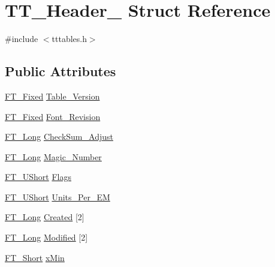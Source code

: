 \hypertarget{struct_t_t___header__}{}\section{T\+T\+\_\+\+Header\+\_\+ Struct Reference}
\label{struct_t_t___header__}


{\ttfamily \#include $<$tttables.\+h$>$}

\subsection*{Public Attributes}
\begin{DoxyCompactItemize}
\item 
\mbox{\hyperlink{fttypes_8h_a5f5a679cc09f758efdd0d1c5feed3c3d}{F\+T\+\_\+\+Fixed}} \mbox{\hyperlink{struct_t_t___header___ab14622e8f8f80ee8361f4847cf9c36e1}{Table\+\_\+\+Version}}
\item 
\mbox{\hyperlink{fttypes_8h_a5f5a679cc09f758efdd0d1c5feed3c3d}{F\+T\+\_\+\+Fixed}} \mbox{\hyperlink{struct_t_t___header___aa5d0f9f88a7ffc755982a1a9dbb58f21}{Font\+\_\+\+Revision}}
\item 
\mbox{\hyperlink{fttypes_8h_a7fa72a1f0e79fb1860c5965789024d6f}{F\+T\+\_\+\+Long}} \mbox{\hyperlink{struct_t_t___header___a5ca008fa01e9568769287febc2abd807}{Check\+Sum\+\_\+\+Adjust}}
\item 
\mbox{\hyperlink{fttypes_8h_a7fa72a1f0e79fb1860c5965789024d6f}{F\+T\+\_\+\+Long}} \mbox{\hyperlink{struct_t_t___header___a24e0dde7596c7303c8b8872feb1c221f}{Magic\+\_\+\+Number}}
\item 
\mbox{\hyperlink{fttypes_8h_a937f6c17cf5ffd09086d8610c37b9f58}{F\+T\+\_\+\+U\+Short}} \mbox{\hyperlink{struct_t_t___header___a9e81d0e6bf9a83ebf28f768d83559f38}{Flags}}
\item 
\mbox{\hyperlink{fttypes_8h_a937f6c17cf5ffd09086d8610c37b9f58}{F\+T\+\_\+\+U\+Short}} \mbox{\hyperlink{struct_t_t___header___a594567319e6b6b5a823567279d26857d}{Units\+\_\+\+Per\+\_\+\+EM}}
\item 
\mbox{\hyperlink{fttypes_8h_a7fa72a1f0e79fb1860c5965789024d6f}{F\+T\+\_\+\+Long}} \mbox{\hyperlink{struct_t_t___header___a1e5d99f35ae2a604c6f54da94dc5105f}{Created}} \mbox{[}2\mbox{]}
\item 
\mbox{\hyperlink{fttypes_8h_a7fa72a1f0e79fb1860c5965789024d6f}{F\+T\+\_\+\+Long}} \mbox{\hyperlink{struct_t_t___header___a48db8e244aee26da683240e67644619e}{Modified}} \mbox{[}2\mbox{]}
\item 
\mbox{\hyperlink{fttypes_8h_aa7279be89046a2563cd3d4d6651fbdcf}{F\+T\+\_\+\+Short}} \mbox{\hyperlink{struct_t_t___header___ae4553d76427d9f7a28595ed71897dcbb}{x\+Min}}

\end{DoxyCompactItemize}
